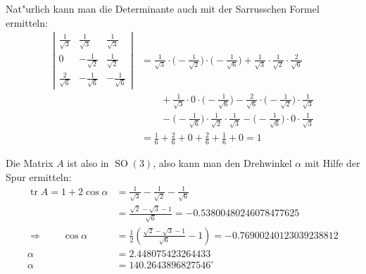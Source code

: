 \begin{loesung}
\begin{teilaufgaben}
Nat"urlich kann man die Determinante auch mit der Sarrusschen Formel ermitteln:
\begin{align*}
\left|
\begin{matrix}
\frac1{\sqrt{3}}&\frac1{\sqrt{3}}&\frac1{\sqrt{3}}\\
0&-\frac1{\sqrt{2}}&\frac1{\sqrt{2}}\\
\frac2{\sqrt{6}}&-\frac1{\sqrt{6}}&-\frac1{\sqrt{6}}
\end{matrix}
\right|
&=
\frac1{\sqrt{3}}\cdot\biggl(-\frac1{\sqrt{2}}\biggr)\cdot\biggl(-\frac1{\sqrt{6}}\biggr)
+
\frac1{\sqrt{3}}\cdot\frac1{\sqrt{2}}\cdot\frac2{\sqrt{6}}
\\
&\qquad 
+
\frac1{\sqrt{3}}\cdot0\cdot\biggl(-\frac1{\sqrt{6}}\biggr)
-
\frac2{\sqrt{6}}\cdot\biggl(-\frac1{\sqrt{2}}\biggr)\cdot\frac1{\sqrt{3}}
\\
&\qquad
-
\biggl(-\frac1{\sqrt{6}}\biggr)\cdot\frac1{\sqrt{2}}\cdot \frac1{\sqrt{3}}
-
\biggl(-\frac1{\sqrt{6}}\biggr)\cdot0\cdot\frac1{\sqrt{3}}
\\
&=
\frac16+\frac26+0+\frac26+\frac16+0=1
\end{align*}
\item
Die Matrix $A$ ist also in $\operatorname{SO}(3)$, also kann man den
Drehwinkel $\alpha$ mit Hilfe der Spur ermitteln:
\begin{align*}
\operatorname{tr} A=1+2\cos\alpha&=\frac1{\sqrt{3}}-\frac1{\sqrt{2}}-\frac1{\sqrt{6}}
\\
&=\frac{\sqrt{2}-\sqrt{3}-1}{\sqrt{6}}=-0.53800480246078477625
\\
\Rightarrow\qquad
\cos\alpha&=\frac12\left(
\frac{\sqrt{2}-\sqrt{3}-1}{\sqrt{6}}-1
\right)=-0.76900240123039238812
\\
\alpha&=2.448075423264433\\
\alpha&=140.2643896827546^\circ\\
\end{align*}
\end{teilaufgaben}
\end{loesung}

